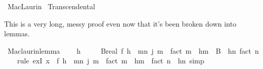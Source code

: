 %
\begin{isabellebody}%
%
%
\isadelimdocument
%
\endisadelimdocument
%
\isatagdocument
%
\isamarkuptrue%
%
\endisatagdocument
{\isafolddocument}%
%
\isadelimdocument
%
\endisadelimdocument
%
\isadelimtheory
%
\endisadelimtheory
%
\isatagtheory
{}\isamarkupfalse%
\ MacLaurin\isanewline
{}\ Transcendental\isanewline
{}%
\endisatagtheory
{\isafoldtheory}%
%
\isadelimtheory
%
\endisadelimtheory
%
\isadelimdocument
%
\endisadelimdocument
%
\isatagdocument
%
\isamarkuptrue%
%
\endisatagdocument
{\isafolddocument}%
%
\isadelimdocument
%
\endisadelimdocument
%
\begin{isamarkuptext}%
This is a very long, messy proof even now that it's been broken down
  into lemmas.%
\end{isamarkuptext}\isamarkuptrue%
\isamarkupfalse%
\ Maclaurin{\isacharunderscore}{\kern0pt}lemma{\isacharcolon}{\kern0pt}\isanewline
\ \ {\isachardoublequoteopen}{}\ {\isacharless}{\kern0pt}\ h\ {\isasymLongrightarrow}\isanewline
\ \ \ \ {\isasymexists}B{\isacharcolon}{\kern0pt}{\isacharcolon}{\kern0pt}real{\isachardot}{\kern0pt}\ f\ h\ {\isacharequal}{\kern0pt}\ {\isacharparenleft}{\kern0pt}{\isasymSum}m{\isacharless}{\kern0pt}n{\isachardot}{\kern0pt}\ {\isacharparenleft}{\kern0pt}j\ m\ {\isacharslash}{\kern0pt}\ {\isacharparenleft}{\kern0pt}fact\ m{\isacharparenright}{\kern0pt}{\isacharparenright}{\kern0pt}\ {\isacharasterisk}{\kern0pt}\ {\isacharparenleft}{\kern0pt}h{\isacharcircum}{\kern0pt}m{\isacharparenright}{\kern0pt}{\isacharparenright}{\kern0pt}\ {\isacharplus}{\kern0pt}\ {\isacharparenleft}{\kern0pt}B\ {\isacharasterisk}{\kern0pt}\ {\isacharparenleft}{\kern0pt}{\isacharparenleft}{\kern0pt}h{\isacharcircum}{\kern0pt}n{\isacharparenright}{\kern0pt}\ {\isacharslash}{\kern0pt}{\isacharparenleft}{\kern0pt}fact\ n{\isacharparenright}{\kern0pt}{\isacharparenright}{\kern0pt}{\isacharparenright}{\kern0pt}{\isachardoublequoteclose}\isanewline
%
\isadelimproof
\ \ %
\endisadelimproof
%
\isatagproof
{}\isamarkupfalse%
\ {\isacharparenleft}{\kern0pt}rule\ exI{\isacharbrackleft}{\kern0pt}\ x\ {\isacharequal}{\kern0pt}\ {\isachardoublequoteopen}{\isacharparenleft}{\kern0pt}f\ h\ {\isacharminus}{\kern0pt}\ {\isacharparenleft}{\kern0pt}{\isasymSum}m{\isacharless}{\kern0pt}n{\isachardot}{\kern0pt}\ {\isacharparenleft}{\kern0pt}j\ m\ {\isacharslash}{\kern0pt}\ {\isacharparenleft}{\kern0pt}fact\ m{\isacharparenright}{\kern0pt}{\isacharparenright}{\kern0pt}\ {\isacharasterisk}{\kern0pt}\ h{\isacharcircum}{\kern0pt}m{\isacharparenright}{\kern0pt}{\isacharparenright}{\kern0pt}\ {\isacharasterisk}{\kern0pt}\ {\isacharparenleft}{\kern0pt}fact\ n{\isacharparenright}{\kern0pt}\ {\isacharslash}{\kern0pt}\ {\isacharparenleft}{\kern0pt}h{\isacharcircum}{\kern0pt}n{\isacharparenright}{\kern0pt}{\isachardoublequoteclose}{\isacharbrackright}{\kern0pt}{\isacharparenright}{\kern0pt}\ simp%

\end{isabellebody}
